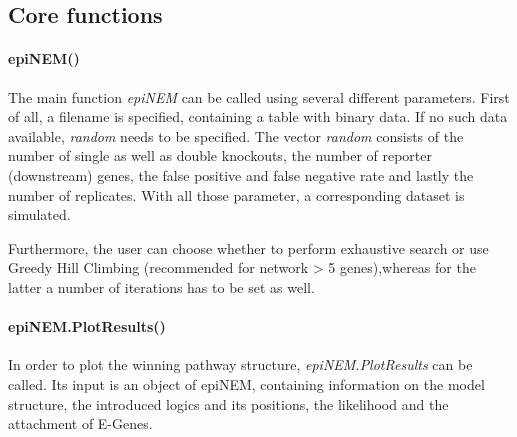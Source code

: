 \documentclass[paper=a4,notitlepage,DIV=12]{scrartcl}\usepackage[]{graphicx}\usepackage[]{color}
\begin{document}
\subsection{Core functions}

\paragraph{epiNEM()}
The main function \emph{epiNEM} can be called using several different parameters. First of all, a filename is specified, containing a table with binary data. If no such data available, \emph{random} needs to be specified. The vector \emph{random} consists of the number of single as well as double knockouts, the number of reporter (downstream) genes, the false positive and false negative rate and lastly the number of replicates. With all those parameter, a corresponding dataset is simulated.

Furthermore, the user can choose whether to perform exhaustive search or use Greedy Hill Climbing (recommended for network > 5 genes),whereas for the latter a number of iterations has to be set as well.

\paragraph{epiNEM.PlotResults()}
In order to plot the winning pathway structure, \emph{epiNEM.PlotResults} can be called. Its input is an object of epiNEM, containing information on the model structure, the introduced logics and its positions, the likelihood and the attachment of E-Genes.
\end{document}
